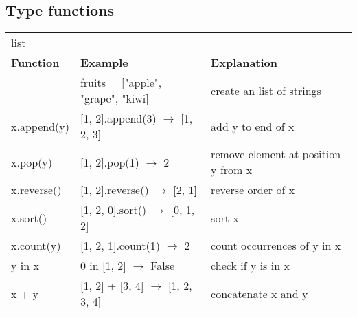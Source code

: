 \documentclass[12pt]{article}
\begin{document}
\subsection*{Type functions}
\begin{longtable}{p{3cm} p{8cm} p{7cm}}
\textsf{\large\color{gray} list} & & \\[0.2cm]
\textbf{Function} & \textbf{Example} & \textbf{Explanation}\\[0.2cm]
[] & fruits = ["apple",  "grape", "kiwi] & create an list of strings \\
x.append(y) & [1, 2].append(3) \boldmath$\rightarrow$ [1, 2, 3] & \textsf{add y to end of x} \\
x.pop(y) & [1, 2].pop(1) \boldmath$\rightarrow$ 2 & \textsf{remove element at position y from x} \\
x.reverse() & [1, 2].reverse() \boldmath$\rightarrow$ [2, 1] & \textsf{reverse order of x} \\
x.sort() & [1, 2, 0].sort() \boldmath$\rightarrow$ [0, 1, 2] & \textsf{sort x} \\
x.count(y) & [1, 2, 1].count(1) \boldmath$\rightarrow$ 2 & \textsf{count occurrences of y in x}\\
y in x & 0 in [1, 2] \boldmath$\rightarrow$ False & \textsf{check if y is in x} \\
x + y & [1, 2] + [3, 4] \boldmath$\rightarrow$ [1, 2, 3, 4] & \textsf{concatenate x and y} \\[0.8cm]


\end{longtable}
\end{document}
